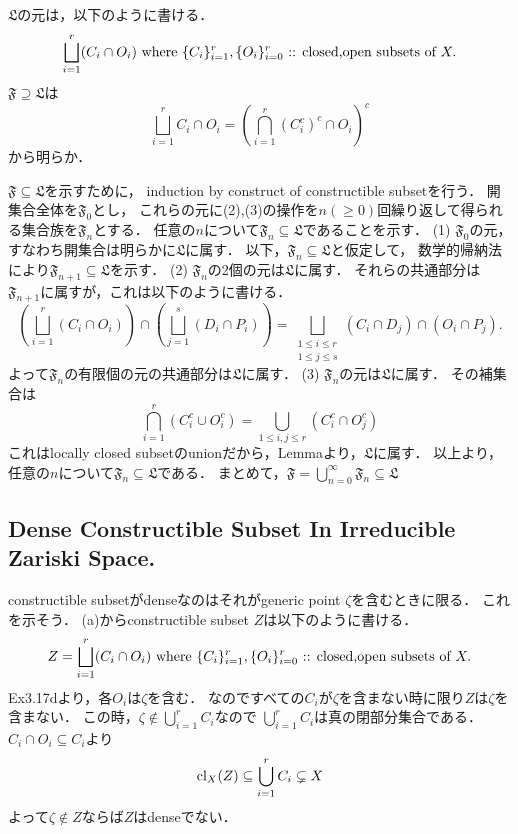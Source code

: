\documentclass[a4paper]{jsarticle}
\begin{document}
    $\mathfrak{L}$の元は，以下のように書ける．
    \[
        \bigsqcup_{i=1}^r (C_i \cap O_i)
        \text{ where }
        \{C_i\}_{i=1}^r, \{O_i\}_{i=0}^r\text{ :: closed,open subsets of }X.
    \]
    $\mathfrak{F} \supseteq \mathfrak{L}$は
    \[
        \bigsqcup_{i=1}^r C_i \cap O_i
        =\left(\bigcap_{i=1}^r (C_i^c)^c \cap O_i\right)^c
    \]
    から明らか．

    $\mathfrak{F} \subseteq \mathfrak{L}$を示すために，
    induction by construct of constructible subsetを行う．
    開集合全体を$\mathfrak{F}_0$とし，
    これらの元に(2),(3)の操作を$n (\geq 0)$回繰り返して得られる集合族を$\mathfrak{F}_{n}$とする．
    任意の$n$について$\mathfrak{F}_{n} \subseteq \mathfrak{L}$であることを示す．
    (1) $\mathfrak{F}_0$の元，すなわち開集合は明らかに$\mathfrak{L}$に属す．
    以下，$\mathfrak{F}_{n} \subseteq \mathfrak{L}$と仮定して，
    数学的帰納法により$\mathfrak{F}_{n+1} \subseteq \mathfrak{L}$を示す．
    (2) $\mathfrak{F}_{n}$の2個の元は$\mathfrak{L}$に属す．
    それらの共通部分は$\mathfrak{F}_{n+1}$に属すが，これは以下のように書ける．
    \[
        \left( \bigsqcup_{i=1}^r (C_i \cap O_i) \right) \cap \left( \bigsqcup_{j=1}^s (D_i \cap P_i) \right)
        =
        \bigsqcup_{\substack{1 \leq i \leq r \\ 1 \leq j \leq s}}
            (C_i \cap D_j) \cap (O_i \cap P_j).
    \]
    よって$\mathfrak{F}_{n}$の有限個の元の共通部分は$\mathfrak{L}$に属す．
    (3) $\mathfrak{F}_{n}$の元は$\mathfrak{L}$に属す．
    その補集合は
    \[
        \bigcap_{i=1}^r (C_i^c \cup O_i^c)
        =
        \bigcup_{1 \leq i,j \leq r} (C_i^c \cap O_j^c)
    \]
    これはlocally closed subsetのunionだから，Lemmaより，$\mathfrak{L}$に属す．
    以上より，任意の$n$について$\mathfrak{F}_{n} \subseteq \mathfrak{L}$である．
    まとめて，$\mathfrak{F} = \bigcup_{n=0}^{\infty} \mathfrak{F}_{n} \subseteq \mathfrak{L}$

    \subsection{Dense Constructible Subset In Irreducible Zariski Space.}
    constructible subsetがdenseなのはそれがgeneric point $\zeta$を含むときに限る．
    これを示そう．
    (a)からconstructible subset $Z$は以下のように書ける．
    \[
        Z=\bigsqcup_{i=1}^r (C_i \cap O_i)
        \text{ where }
        \{C_i\}_{i=1}^r, \{O_i\}_{i=0}^r\text{ :: closed,open subsets of }X.
    \]
    Ex3.17dより，各$O_i$は$\zeta$を含む．
    なのですべての$C_i$が$\zeta$を含まない時に限り$Z$は$\zeta$を含まない．
    この時，$\zeta \not \in \bigcup_{i=1}^r C_i$なので
    $\bigcup_{i=1}^r C_i$は真の閉部分集合である．
    $C_i \cap O_i \subseteq C_i$より
    \[ \operatorname{cl}_X(Z) \subseteq \bigcup_{i=1}^r C_i \subsetneq X \]
    よって$\zeta \not \in Z$ならば$Z$はdenseでない．
\end{document}
